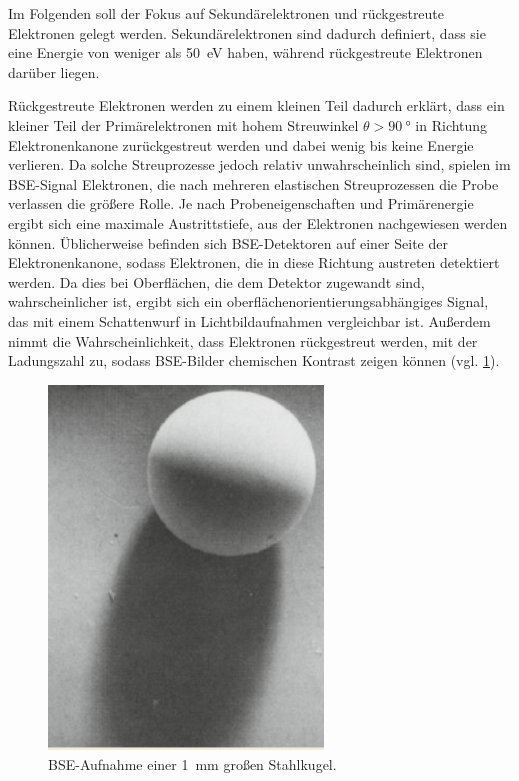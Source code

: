 Im Folgenden soll der Fokus auf Sekundärelektronen und rückgestreute Elektronen gelegt werden.
Sekundärelektronen sind dadurch definiert, dass sie eine Energie von weniger als \SI{50}{eV} haben, während rückgestreute Elektronen darüber liegen.

Rückgestreute Elektronen werden zu einem kleinen Teil dadurch erklärt, dass ein kleiner Teil der Primärelektronen mit hohem Streuwinkel $\theta > \SI{90}{\degree}$ in Richtung Elektronenkanone zurückgestreut werden und dabei wenig bis keine Energie verlieren.
Da solche Streuprozesse jedoch relativ unwahrscheinlich sind, spielen im BSE-Signal Elektronen, die nach mehreren elastischen Streuprozessen die Probe verlassen die größere Rolle.
Je nach Probeneigenschaften und Primärenergie ergibt sich eine maximale Austrittstiefe, aus der Elektronen nachgewiesen werden können.
Üblicherweise befinden sich BSE-Detektoren auf einer Seite der Elektronenkanone, sodass Elektronen, die in diese Richtung austreten detektiert werden.
Da dies bei Oberflächen, die dem Detektor zugewandt sind, wahrscheinlicher ist, ergibt sich ein oberflächenorientierungsabhängiges Signal, das mit einem Schattenwurf in Lichtbildaufnahmen vergleichbar ist.
Außerdem nimmt die Wahrscheinlichkeit, dass Elektronen rückgestreut werden, mit der Ladungszahl zu, sodass BSE-Bilder chemischen Kontrast zeigen können (vgl. \cref{fig:bse-schatten}).

\begin{figure}[!ht]
    \centering
    \includegraphics[width=0.65\textwidth]{img/bse-example}
    \caption{
     BSE-Aufnahme einer \SI{1}{mm} großen Stahlkugel. \cite{springer-handbook}
    }
    \label{fig:bse-schatten}
\end{figure}

